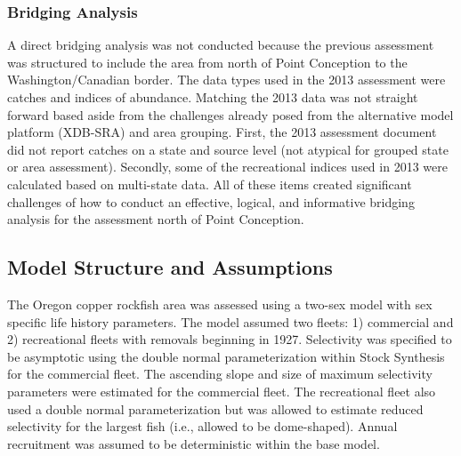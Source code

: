\documentclass[11pt,
  english,
  a4paper,
]{article}
\begin{document}
\leavevmode\tagmcend\tagstructend\par


\hypertarget{bridging-analysis}{%
\subsubsection{Bridging Analysis}\label{bridging-analysis}}

\leavevmode\tagmcend\tagstructend


A direct bridging analysis was not conducted because the previous assessment was structured to include the area from north of Point Conception to the Washington/Canadian border. The data types used in the 2013 assessment were catches and indices of abundance. Matching the 2013 data was not straight forward based aside from the challenges already posed from the alternative model platform (XDB-SRA) and area grouping. First, the 2013 assessment document did not report catches on a state and source level (not atypical for grouped state or area assessment). Secondly, some of the recreational indices used in 2013 were calculated based on multi-state data. All of these items created significant challenges of how to conduct an effective, logical, and informative bridging analysis for the assessment north of Point Conception.

\leavevmode\tagmcend\tagstructend\par


\hypertarget{model-structure-and-assumptions}{%
\subsection{Model Structure and Assumptions}\label{model-structure-and-assumptions}}

\leavevmode\tagmcend\tagstructend


The Oregon copper rockfish area was assessed using a two-sex model with sex specific life history parameters. The model assumed two fleets: 1) commercial and 2) recreational fleets with removals beginning in 1927. Selectivity was specified to be asymptotic using the double normal parameterization within Stock Synthesis for the commercial fleet. The ascending slope and size of maximum selectivity parameters were estimated for the commercial fleet. The recreational fleet also used a double normal parameterization but was allowed to estimate reduced selectivity for the largest fish (i.e., allowed to be dome-shaped). Annual recruitment was assumed to be deterministic within the base model.
\end{document}
